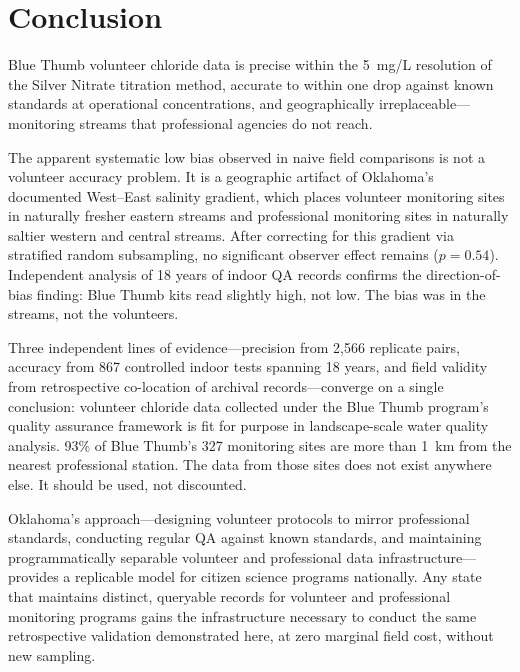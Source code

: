 \documentclass[lineno]{wlpeerj}
\begin{document}
\section{Conclusion}

Blue Thumb volunteer chloride data is precise within the 5~mg/L resolution of the Silver Nitrate titration method, accurate to within one drop against known standards at operational concentrations, and geographically irreplaceable---monitoring streams that professional agencies do not reach.

The apparent systematic low bias observed in naive field comparisons is not a volunteer accuracy problem. It is a geographic artifact of Oklahoma's documented West--East salinity gradient, which places volunteer monitoring sites in naturally fresher eastern streams and professional monitoring sites in naturally saltier western and central streams. After correcting for this gradient via stratified random subsampling, no significant observer effect remains ($p = 0.54$). Independent analysis of 18 years of indoor QA records confirms the direction-of-bias finding: Blue Thumb kits read slightly high, not low. The bias was in the streams, not the volunteers.

Three independent lines of evidence---precision from 2,566 replicate pairs, accuracy from 867 controlled indoor tests spanning 18 years, and field validity from retrospective co-location of archival records---converge on a single conclusion: volunteer chloride data collected under the Blue Thumb program's quality assurance framework is fit for purpose in landscape-scale water quality analysis. 93\% of Blue Thumb's 327 monitoring sites are more than 1~km from the nearest professional station. The data from those sites does not exist anywhere else. It should be used, not discounted.

Oklahoma's approach---designing volunteer protocols to mirror professional standards, conducting regular QA against known standards, and maintaining programmatically separable volunteer and professional data infrastructure---provides a replicable model for citizen science programs nationally. Any state that maintains distinct, queryable records for volunteer and professional monitoring programs gains the infrastructure necessary to conduct the same retrospective validation demonstrated here, at zero marginal field cost, without new sampling.
\end{document}
